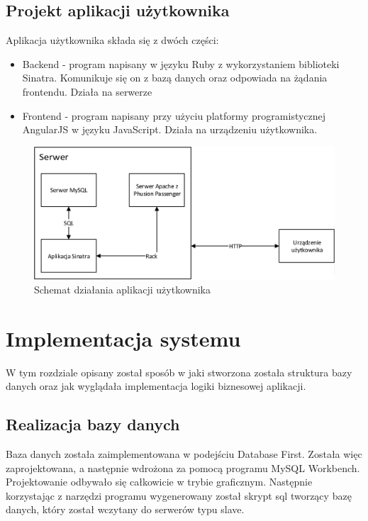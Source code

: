 \documentclass{mgr}
\begin{document}
\section{Projekt aplikacji użytkownika}
Aplikacja użytkownika składa się z dwóch części:
\begin{itemize}
\item Backend - program napisany w języku Ruby z wykorzystaniem biblioteki Sinatra. Komunikuje się on z bazą danych oraz odpowiada na żądania frontendu. Działa na serwerze
\item Frontend - program napisany przy użyciu platformy programistycznej AngularJS w języku JavaScript. Działa na urządzeniu użytkownika.
\end{itemize}
\begin{figure}[!h]
	\centering
	\includegraphics[width=\textwidth]{images/aplikacja.png}
	\caption{Schemat działania aplikacji użytkownika}
	\label{fig:aplikacja}
\end{figure}

\chapter{Implementacja systemu}
W tym rozdziale opisany został sposób w jaki stworzona została struktura bazy danych oraz jak wyglądała implementacja logiki biznesowej aplikacji.

\section{Realizacja bazy danych}
Baza danych została zaimplementowana w podejściu Database First. Została więc zaprojektowana, a następnie wdrożona za pomocą programu MySQL Workbench. Projektowanie odbywało się całkowicie w trybie graficznym. Następnie korzystając z narzędzi programu wygenerowany został skrypt sql tworzący bazę danych, który został wczytany do serwerów typu slave.
\end{document}
